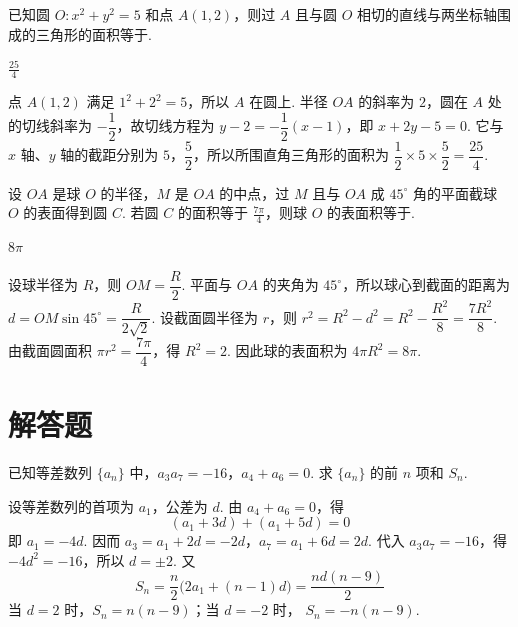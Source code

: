 \begin{problem}
已知圆 \(O: x^{2} + y^{2} = 5\) 和点 \(A(1,2)\)，则过 \(A\) 且与圆 \(O\) 相切的直线与两坐标轴围成的三角形的面积等于\fillinblank{}.
\end{problem}

\begin{answer}
\(\frac{25}{4}\)
\end{answer}

\begin{solution}
点 \(A(1,2)\) 满足 \(1^2+2^2=5\)，所以 \(A\) 在圆上. 半径 \(OA\) 的斜率为 \(2\)，圆在 \(A\) 处的切线斜率为 \(-\dfrac12\)，故切线方程为 \(y-2=-\dfrac12(x-1)\)，即 \(x+2y-5=0\). 它与 \(x\) 轴、\(y\) 轴的截距分别为 \(5\)，\(\dfrac52\)，所以所围直角三角形的面积为 \(\dfrac12\times5\times\dfrac52=\dfrac{25}{4}\).
\end{solution}

\begin{problem}
设 \(OA\) 是球 \(O\) 的半径，\(M\) 是 \(OA\) 的中点，过 \(M\) 且与 \(OA\) 成 \(45^{\circ}\) 角的平面截球 \(O\) 的表面得到圆 \(C\). 若圆 \(C\) 的面积等于 \(\frac{7\pi}{4}\)，则球 \(O\) 的表面积等于\fillinblank{}.
\end{problem}

\begin{answer}
\(8\pi\)
\end{answer}

\begin{solution}
设球半径为 \(R\)，则 \(OM=\dfrac R2\). 平面与 \(OA\) 的夹角为 \(45^{\circ}\)，所以球心到截面的距离为 \(d=OM\sin45^{\circ}=\dfrac{R}{2\sqrt2}\). 设截面圆半径为 \(r\)，则 \(r^2=R^2-d^2=R^2-\dfrac{R^2}{8}=\dfrac{7R^2}{8}\). 由截面圆面积 \(\pi r^2=\dfrac{7\pi}{4}\)，得 \(R^2=2\). 因此球的表面积为 \(4\pi R^2=8\pi\).
\end{solution}

\section{解答题}

\begin{problem}
已知等差数列 \(\{a_{n}\}\) 中，\(a_{3}a_{7} = -16\)，\(a_{4} + a_{6} = 0\). 求 \(\{a_{n}\}\) 的前 \(n\) 项和 \(S_{n}\).
\end{problem}

\begin{solution}
设等差数列的首项为 \(a_1\)，公差为 \(d\). 由
\(a_4+a_6=0\)，得
\[
(a_1+3d)+(a_1+5d)=0
\]
即 \(a_1=-4d\). 因而
\(a_3=a_1+2d=-2d\)，\(a_7=a_1+6d=2d\).
代入 \(a_3a_7=-16\)，得
\(-4d^2=-16\)，所以 \(d=\pm2\).
又
\[
S_n=\frac n2\bigl(2a_1+(n-1)d\bigr)
    =\frac{nd(n-9)}2
\]
当 \(d=2\) 时，\(S_n=n(n-9)\)；当 \(d=-2\) 时，
\(S_n=-n(n-9)\).
\end{solution}

